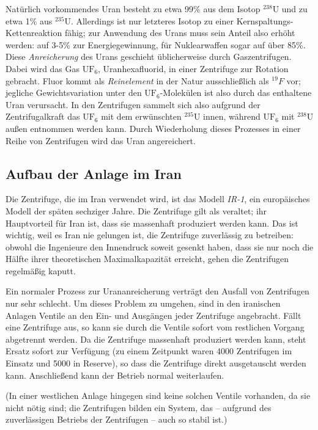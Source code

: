 \documentclass[a4paper]{article}
\begin{document}
Natürlich vorkommendes Uran besteht zu etwa 99\% aus dem Isotop $^{238}\mathrm U$ und zu etwa 1\% aus $^{235}\mathrm U$.
Allerdings ist nur letzteres Isotop zu einer Kernspaltungs-Kettenreaktion fähig;
zur Anwendung des Urans muss sein Anteil also erhöht werden: auf 3-5\% zur Energiegewinnung, für Nuklearwaffen sogar auf über 85\%.
Diese \emph{Anreicherung} des Urans geschieht üblicherweise durch Gaszentrifugen.
Dabei wird das Gas $\mathrm{UF}_6$, Uranhexafluorid, in einer Zentrifuge zur Rotation gebracht.
Fluor kommt als \emph{Reinelement} in der Natur ausschließlich als $^{19}F$ vor;
jegliche Gewichtsvariation unter den $\mathrm{UF}_6$-Molekülen ist also durch das enthaltene Uran verursacht.
In den Zentrifugen sammelt sich also aufgrund der Zentrifugalkraft das $\mathrm{UF}_6$ mit dem erwünschten $^{235}\mathrm U$ innen,
während $\mathrm{UF}_6$ mit $^{238}\mathrm U$ außen entnommen werden kann.
Durch Wiederholung dieses Prozesses in einer Reihe von Zentrifugen wird das Uran angereichert.\cite{wiki:urananreicherung}

\subsection{Aufbau der Anlage im Iran}

Die Zentrifuge, die im Iran verwendet wird, ist das Modell \emph{IR-1}, ein europäisches Modell der späten sechziger Jahre.
Die Zentrifuge gilt als veraltet; ihr Hauptvorteil für Iran ist, dass sie massenhaft produziert werden kann.
Das ist wichtig, weil es Iran nie gelungen ist, die Zentrifuge zuverlässig zu betreiben:
obwohl die Ingenieure den Innendruck soweit gesenkt haben, dass sie nur noch die Hälfte ihrer theoretischen Maximalkapazität erreicht,
gehen die Zentrifugen regelmäßig kaputt.

Ein normaler Prozess zur Urananreicherung verträgt den Ausfall von Zentrifugen nur sehr schlecht.
Um dieses Problem zu umgehen, sind in den iranischen Anlagen Ventile an den Ein- und Ausgängen jeder Zentrifuge angebracht.
Fällt eine Zentrifuge aus, so kann sie durch die Ventile sofort vom restlichen Vorgang abgetrennt werden.
Da die Zentrifuge massenhaft produziert werden kann, steht Ersatz sofort zur Verfügung
(zu einem Zeitpunkt waren 4000 Zentrifugen im Einsatz und 5000 in Reserve\cite{tkac}), %
so dass die Zentrifuge direkt ausgetauscht werden kann.
Anschließend kann der Betrieb normal weiterlaufen.

(In einer westlichen Anlage hingegen sind keine solchen Ventile vorhanden, da sie nicht nötig sind;
die Zentrifugen bilden ein System, das – aufgrund des zuverlässigen Betriebs der Zentrifugen – auch so stabil ist.)
\end{document}
